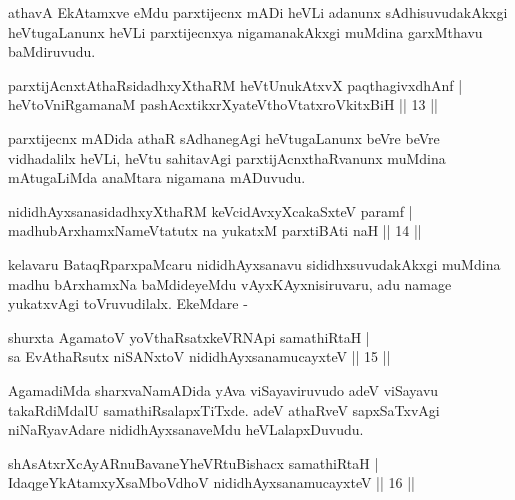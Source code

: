 \begin{artha}
athavA EkAtamxve eMdu parxtijecnx mADi heVLi adanunx sAdhisuvudakAkxgi heVtugaLanunx heVLi parxtijecnxya nigamanakAkxgi muMdina garxMthavu baMdiruvudu.
\end{artha}


\begin{shl}
parxtijAcnxtAthaRsidadhxyXthaRM heVtUnukAtxvX paqthagivxdhAnf |\\
heVtoVniRgamanaM pashAcxtikxrXyateV\s thoVtatxroVkitxBiH \hfill || 13 ||
\end{shl}

\begin{artha}
parxtijecnx mADida athaR sAdhanegAgi heVtugaLanunx beVre beVre vidhadalilx heVLi, heVtu sahitavAgi parxtijAcnxthaRvanunx muMdina mAtugaLiMda anaMtara nigamana mADuvudu.
\end{artha}

\begin{shl}
nididhAyxsanasidadhxyXthaRM keVcidAvxyXcakaSxteV paramf |\\
madhubArxhamxNameVtatutx na yukatxM parxtiBAti naH \hfill || 14 ||
\end{shl}

\begin{artha}
kelavaru BataqRparxpaMcaru nididhAyxsanavu sididhxsuvudakAkxgi muMdina
madhu \-bArxhamxNa baMdideyeMdu vAyxKAyxnisiruvaru, adu namage
yukatxvAgi \-toVruvudilalx. EkeMdare -
\end{artha}

\begin{shl}
shurxta AgamatoV yoV\s thaRsatxkeVRNApi samathiRtaH |\\
sa EvAthaRsutx niSANxtoV nididhAyxsanamucayxteV \hfill || 15 ||
\end{shl}

\begin{artha}
AgamadiMda sharxvaNamADida yAva viSayaviruvudo adeV viSayavu takaRdiMdalU samathiRsalapxTiTxde. adeV athaRveV sapxSaTxvAgi niNaRyavAdare nididhAyxsanaveMdu heVLalapxDuvudu.
\end{artha}


\begin{shl}
shAsAtxrXcAyARnuBavaneYheVRtuBishacx samathiRtaH |\\
IdaqgeYkAtamxyXsaMboVdhoV nididhAyxsanamucayxteV \hfill || 16 ||
\end{shl}

